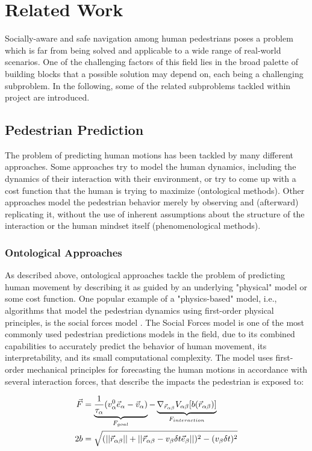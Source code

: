 \chapter{Related Work}
\label{text:related}
Socially-aware and safe navigation among human pedestrians poses a problem which is far from being solved and applicable to a wide range of real-world scenarios. One of the challenging factors of this field lies in the broad palette of building blocks that a possible solution may depend on, each being a challenging subproblem. In the following, some of the related subproblems tackled within project \project are introduced.

\section{Pedestrian Prediction}
\label{text:related/prediction}
The problem of predicting human motions has been tackled by many different approaches. Some approaches try to model the human dynamics, including the dynamics of their interaction with their environment, or try to come up with a cost function that the human is trying to maximize (ontological methods). Other approaches model the pedestrian behavior merely by observing and (afterward) replicating it, without the use of inherent assumptions about the structure of the interaction or the human mindset itself (phenomenological methods).

\subsection{Ontological Approaches}
As described above, ontological approaches tackle the problem of predicting human movement by describing it as guided by an underlying "physical" model or some cost function. One popular example of a "physics-based" model, i.e., algorithms that model the pedestrian dynamics using first-order physical principles, is the social forces model \cite{Helbing1995}. The Social Forces model is one of the most commonly used pedestrian predictions models in the field, due to its combined capabilities to accurately predict the behavior of human movement, its interpretability, and its small computational complexity. The model uses first-order mechanical principles for forecasting the human motions in accordance with several interaction forces, that describe the impacts the pedestrian is exposed to:

\begin{align}
\vec{F} &= \underbrace{\frac{1}{\tau_{\alpha}} (v^0_{\alpha} \vec{e}_{\alpha} - \vec{v}_{\alpha})}_{F_{goal}} - \underbrace{\nabla_{\vec{r}_{\alpha \beta}} V_{\alpha \beta}[b(\vec{r}_{\alpha \beta})]}_{F_{interaction}} 
\label{eq:social_forces} \\
2b &= \sqrt{(||\vec{r}_{\alpha \beta}|| + ||\vec{r}_{\alpha \beta} - v_{\beta} \delta t \vec{e}_{\beta}||)^2 - (v_{\beta} \delta t)^2}
\end{align}

